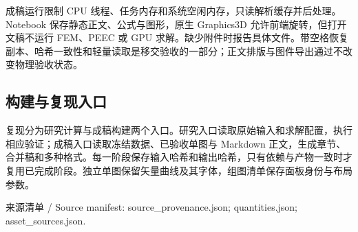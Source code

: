 \documentclass[journal,10pt]{IEEEtran}
\begin{document}
成稿运行限制 CPU 线程、任务内存和系统空闲内存，只读解析缓存并后处理。Notebook 保存静态正文、公式与图形，原生 Graphics3D 允许前端旋转，但打开文稿不运行 FEM、PEEC 或 GPU 求解。缺少附件时报告具体文件。带空格恢复副本、哈希一致性和轻量读取是移交验收的一部分；正文排版与图件导出通过不改变物理验收状态。


\subsection*{构建与复现入口}
\hypertarget{S3.workflow.heading}{}
复现分为研究计算与成稿构建两个入口。研究入口读取原始输入和求解配置，执行相应验证；成稿入口读取冻结数据、已验收单图与 Markdown 正文，生成章节、合并稿和多种格式。每一阶段保存输入哈希和输出哈希，只有依赖与产物一致时才复用已完成阶段。独立单图保留矢量曲线及其字体，组图清单保存面板身份与布局参数。


来源清单 / Source manifest: source\_provenance.json; quantities.json; asset\_sources.json.
\end{document}
